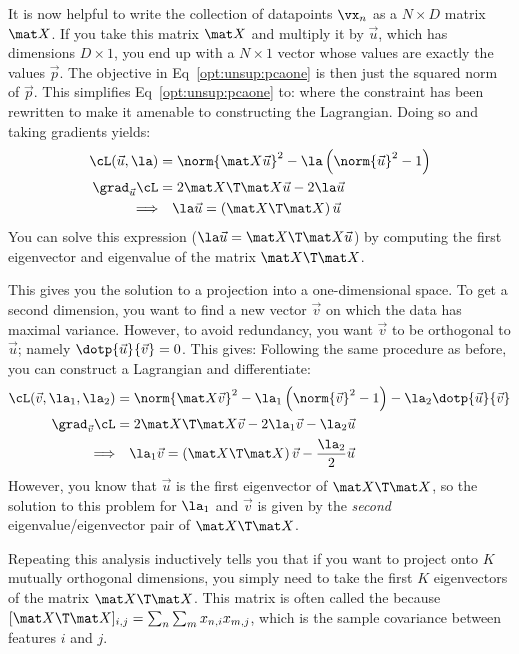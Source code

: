 It is now helpful to write the collection of datapoints $\vx_n$ as a
$N \times D$ matrix $\mat X$.  If you take this matrix $\mat X$ and
multiply it by $\vec u$, which has dimensions $D \times 1$, you end up
with a $N \times 1$ vector whose values are exactly the values $\vec
p$.  The objective in Eq~\eqref{opt:unsup:pcaone} is then just the
squared norm of $\vec p$.  This simplifies
Eq~\eqref{opt:unsup:pcaone} to:
%
%
where the constraint has been rewritten to make it amenable to
constructing the Lagrangian.  Doing so and taking gradients yields:
%
\begin{align}
\cL(\vec u, \la) &=
  \norm{ \mat X \vec u }^2
  - \la \left( \norm{\vec u}^2 - 1 \right) \\
\grad_{\vec u} \cL &=
  2 \mat X\T\mat X \vec u  - 2 \la \vec u \\
\Longrightarrow & \quad\la \vec u =  \left(\mat X\T\mat X\right)\vec u
\end{align}
%
You can solve this expression ($\la \vec u =  \mat X\T\mat X \vec u$)
by computing the first eigenvector and eigenvalue of the matrix $\mat
X\T\mat X$.

This gives you the solution to a projection into a one-dimensional
space.  To get a second dimension, you want to find a new vector $\vec
v$ on which the data has maximal variance.  However, to avoid
redundancy, you want $\vec v$ to be orthogonal to $\vec u$; namely
$\dotp{\vec u}{\vec v} = 0$.  This gives:
%
%
Following the same procedure as before, you can construct a Lagrangian
and differentiate:
%
\begin{align}
\cL(\vec v, \la_1, \la_2) &=
\norm{ \mat X \vec v }^2
  - \la_1 \left( \norm{\vec v}^2 - 1 \right)
  - \la_2 \dotp{\vec u}{\vec v}\\
\grad_{\vec v} \cL &=
  2 \mat X\T\mat X \vec v  - 2 \la_1 \vec v - \la_2 \vec u\\
\Longrightarrow & \quad\la_1 \vec v =  \left(\mat X\T\mat X\right)\vec v
- \frac {\la_2} 2 \vec u
\end{align}
%
However, you know that $\vec u$ is the first eigenvector of $\mat
X\T\mat X$, so the solution to this problem for $\la_1$ and $\vec v$
is given by the \emph{second} eigenvalue/eigenvector pair of $\mat
X\T\mat X$.

Repeating this analysis inductively tells you that if you want to
project onto $K$ mutually orthogonal dimensions, you simply need to
take the first $K$ eigenvectors of the matrix $\mat X\T\mat X$.  This
matrix is often called the  because
$[\mat X\T\mat X]_{i,j} = \sum_n \sum_m x_{n,i} x_{m,j}$, which is the
sample covariance between features $i$ and $j$.

